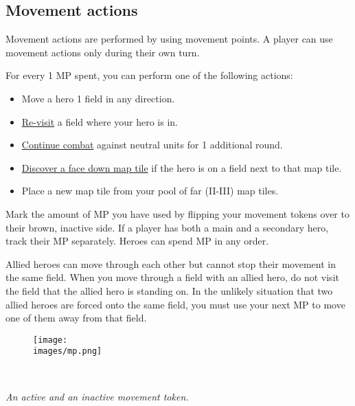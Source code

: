 \documentclass[12pt]{article}
\def\assets{assets}
\def\images{\assets/images}
\begin{document}
\subsection*{Movement actions}
Movement actions are performed by using movement points. A player can use movement actions only during their own turn.\par
For every 1 MP spent, you can perform one of the following actions:
\begin{itemize}
    \item Move a hero 1 field in any direction.
    \item \hyperlink{Categories}{Re-visit} a field where your hero is in.
    \item \hyperlink{Timelimit}{Continue combat} against neutral units for 1 additional round.
    \item \hyperlink{Placing}{Discover a face down map tile} if the hero is on a field next to that map tile.
    \item Place a new map tile from your pool of far (II-III) map tiles.
\end{itemize}
Mark the amount of MP you have used by flipping your movement tokens over to their brown, inactive side. If a player has both a main and a secondary hero, track their MP separately. Heroes can spend MP in any order.\par
Allied heroes can move through each other but cannot stop their movement in the same field. When you move through a field with an allied hero, do not visit the field that the allied hero is standing on. In the unlikely situation that two allied heroes are forced onto the same field, you must use your next MP to move one of them away from that field.
\begin{figure}[h]
\centering
\texttt{[image: \\images/mp.png]}
\end{figure}\\
\begin{center}
\textit{An active and an inactive movement token.}
\end{center}




\clearpage
\end{document}
